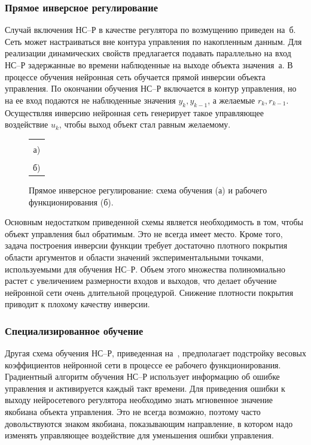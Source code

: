 \subsubsection{Прямое инверсное регулирование}%
\label{direct_inv_nnc}

Случай включения НС--Р в качестве регулятора по возмущению приведен
на~б.  Сеть может настраиваться вне контура
управления по накопленным данным.  Для реализации динамических свойств
предлагается подавать параллельно на вход НС--Р задержанные во времени
наблюденные на выходе объекта значения~а.  В
процессе обучения нейронная сеть обучается прямой инверсии объекта
управления.  По окончании обучения НС--Р включается в контур
управления, но на ее вход подаются не наблюденные значения
$y_k,y_{k-1}$, а желаемые $r_k,r_{k-1}$.  Осуществляя инверсию
нейронная сеть генерирует такое управляющее воздействие $u_k$, чтобы
выход объект стал равным желаемому.

\begin{figure}[h]
\centering
\begin{tabular}{c}
\hbox{} \\
а) \\
\hbox{} \\
б)\\
\end{tabular}
\caption{Прямое инверсное регулирование: схема обучения (а)
         и рабочего функционирования (б).}
\label{fig:direct_nnc}
\end{figure}

Основным недостатком приведенной схемы является необходимость в том,
чтобы объект управления был обратимым.  Это не всегда имеет место.
Кроме того, задача построения инверсии функции требует достаточно
плотного покрытия области аргументов и области значений
экспериментальными точками, используемыми для обучения НС--Р.  Объем
этого множества полиномиально растет с увеличением размерности входов
и выходов, что делает обучение нейронной сети очень длительной
процедурой.  Снижение плотности покрытия приводит к плохому качеству
инверсии.

\subsubsection{Специализированное обучение}

Другая схема обучения НС--Р, приведенная на~,
предполагает подстройку весовых коэффициентов нейронной сети в
процессе ее рабочего функционирования.  Градиентный алгоритм обучения
НС--Р использует информацию об ошибке управления и активируется каждый
такт времени.  Для приведения ошибки к выходу нейросетевого регулятора
необходимо знать мгновенное значение якобиана объекта управления.  Это
не всегда возможно, поэтому часто довольствуются знаком якобиана,
показывающим направление, в котором надо изменять управляющее
воздействие для уменьшения ошибки управления.

